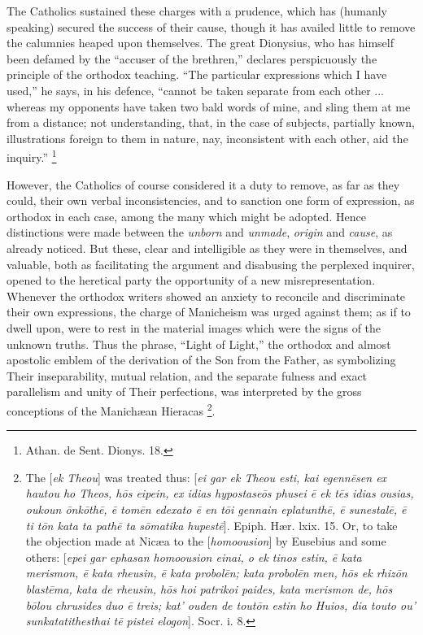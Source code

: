 The Catholics sustained these charges with a prudence, which has
(humanly speaking) secured the success of their cause, though it has
availed little to remove the calumnies heaped upon themselves. The
great Dionysius, who has himself been defamed by the ``accuser of
the brethren,'' declares perspicuously the principle of the
orthodox teaching. ``The particular expressions which I have
used,'' he says, in his defence, ``cannot be taken separate
from each other ... whereas my opponents have taken two bald words of
mine, and sling them at me from a distance; not understanding, that,
in the case of subjects, partially known, illustrations foreign to
them in nature, nay, inconsistent with each other, aid the
inquiry.'' \footnote{Athan. de Sent. Dionys. 18.}

However, the Catholics of course considered it a duty to remove, as
far as they could, their own verbal inconsistencies, and to sanction
one form of expression, as orthodox in each case, among the many which
might be adopted. Hence distinctions were made between the \emph{unborn}
and \emph{unmade}, \emph{origin} and \emph{cause}, as already noticed.
But these, clear and intelligible as they were in themselves, and
valuable, both as facilitating the argument and disabusing the
perplexed inquirer, opened to the heretical party the opportunity
of a new misrepresentation. Whenever the orthodox writers showed
an anxiety to reconcile and discriminate their own expressions, the
charge of Manicheism was urged against them; as if to dwell upon, were
to rest in the material images which were the signs of the unknown
truths. Thus the phrase, ``Light of Light,'' the orthodox and
almost apostolic emblem of the derivation of the Son from the Father,
as symbolizing Their inseparability, mutual relation, and the separate
fulness and exact parallelism and unity of Their perfections, was
interpreted by the gross conceptions of the Manichæan Hieracas \footnote{The [\emph{ek Theou}] was treated thus: [\emph{ei
gar ek Theou esti, kai egenn\={e}sen ex hautou ho Theos, h\={o}s
eipein, ex idias hypostase\={o}s phusei \={e} ek t\={e}s
idias ousias, oukoun \={o}nk\={o}th\={e}, \={e} tom\={e}n
edexato \={e} en t\={o}i gennain eplatunth\={e}, \={e}
sunestal\={e}, \={e} ti t\={o}n kata ta path\={e} ta s\={o}matika
hupest\={e}}]. Epiph. Hær. lxix. 15. Or, to take the objection
made at Nicæa to the [\emph{homoousion}] by Eusebius and some others:
[\emph{epei gar ephasan homoousion einai, o ek tinos estin, \={e} kata
merismon, \={e} kata rheusin, \={e} kata probol\={e}n; kata probol\={e}n
men, h\={o}s
ek rhiz\={o}n blast\={e}ma, kata de rheusin, h\={o}s hoi
patrikoi paides, kata merismon de, h\={o}s b\={o}lou chrusides
duo \={e} treis; kat' ouden de tout\={o}n estin ho Huios, dia
touto ou' sunkatatithesthai t\={e} pistei elogon}]. Socr. i. 8.}.

